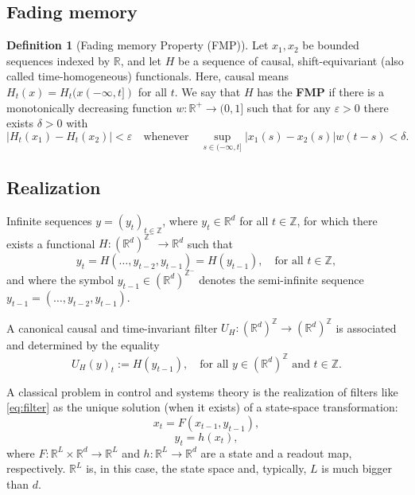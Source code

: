 \documentclass{article}
\theoremstyle{definition}
\newtheorem{definition}{Definition}
\theoremstyle{remark}
\newcounter{ct}
\begin{document}
\subsection{Fading memory}
\begin{definition}[Fading memory Property (FMP)]
Let $x_1, x_2$ be bounded sequences indexed by $\mathbb{R}$, and let $H$ be a sequence of causal, shift-equivariant (also called time-homogeneous) functionals.
Here, causal means $H_t(x) = H_t(x(-\infty,t])$ for all $t$.
We say that $H$ has the \textbf{FMP} if there is a monotonically decreasing function $w : \mathbb{R}^+ \to (0, 1]$ such that for any $\varepsilon > 0$ there exists $\delta > 0$ with 
\[
|H_t(x_1) - H_t(x_2)| < \varepsilon \quad \text{whenever} \quad \sup_{s \in (-\infty, t]} |x_1(s) - x_2(s)| w(t - s) < \delta.
\]
\end{definition}

\subsection{Realization}\label{sec:realization}

Infinite sequences \( y = (y_t)_{t \in \mathbb{Z}} \), where \( y_t \in \mathbb{R}^d \) for all \( t \in \mathbb{Z} \), for which there exists a functional \( H : (\mathbb{R}^d)^{\mathbb{Z}^-} \rightarrow \mathbb{R}^d \) such that 
\begin{equation}\label{eq:filter}
y_t = H(\ldots, y_{t-2}, y_{t-1}) = H\left( y_{t-1} \right), \quad \text{for all } t \in \mathbb{Z},
\end{equation}
and where the symbol \( y_{t-1} \in (\mathbb{R}^d)^{\mathbb{Z}^-} \) denotes the semi-infinite sequence \( y_{t-1} = (\ldots, y_{t-2}, y_{t-1}) \).

A canonical causal and time-invariant filter \( U_H : (\mathbb{R}^d)^{\mathbb{Z}} \rightarrow (\mathbb{R}^d)^{\mathbb{Z}} \) is associated and determined by the equality 
\[
U_H(y)_t := H\left( y_{t-1} \right), \quad \text{for all } y \in (\mathbb{R}^d)^{\mathbb{Z}} \text{ and } t \in \mathbb{Z}.
\]

A classical problem in control and systems theory is the realization of filters like \ref{eq:filter} as the unique solution (when it exists) of a state-space transformation:
\begin{equation}
x_t = F(x_{t-1}, y_{t-1}),
\end{equation}
\begin{equation}
y_t = h(x_t),
\end{equation}
where \( F : \mathbb{R}^L \times \mathbb{R}^d \rightarrow \mathbb{R}^L \) and \( h : \mathbb{R}^L \rightarrow \mathbb{R}^d \) are a state and a readout map, respectively. \( \mathbb{R}^L \) is, in this case, the state space and, typically, \( L \) is much bigger than \( d \).
\end{document}
